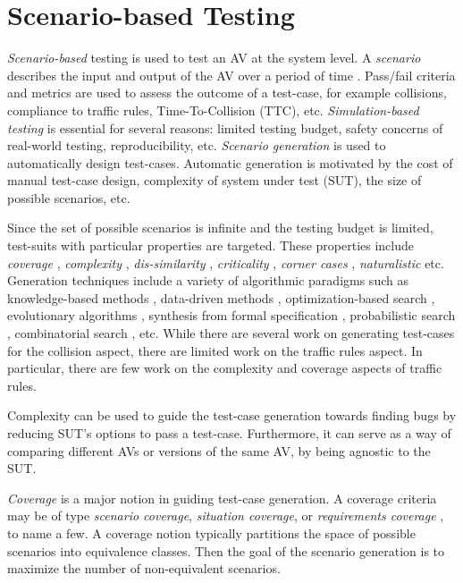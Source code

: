 \section{Scenario-based Testing}

\emph{Scenario-based} testing \cite{Riedmaier.2020} is used to test an AV at the system level.
%
A \emph{scenario} describes the input and output of the AV over a period of time \cite{Ulbrich.2015}.
%
Pass/fail criteria and metrics are used to assess the outcome of a test-case, for example collisions,  compliance to traffic rules, Time-To-Collision (TTC), etc.
%
\emph{Simulation-based testing} \cite{Abdessalem.2018:feature,Abdessalem.2018:vision,Abeysirigoonawardena.2019,Abdessalem.2016,Ding.2020,Gambi.2019,Norden.2019} is essential for several reasons: limited testing budget, safety concerns of real-world testing, reproducibility, etc.
%
\emph{Scenario generation} is used to automatically design test-cases.
%
Automatic generation is motivated by the cost of manual test-case design, complexity of system under test (SUT), the size of possible scenarios, etc.


Since the set of possible scenarios is infinite and the testing budget is limited, test-suits with particular properties are targeted.
%
These properties include \emph{coverage} \cite{Sheikhi.2022}, \emph{complexity} \cite{Gao.2019,Xia.2017,Xia.2018,Wang.2018},
 \emph{dis-similarity} \cite{Harder.2021}, \emph{criticality} \cite{Klischat.2019,Zhong.2021}, \emph{corner cases} \cite{OKelly.2018}, \emph{naturalistic} \cite{Akagi.2019}
 etc.
%
Generation techniques include a variety of algorithmic paradigms such as  knowledge-based methods \cite{Li.2020}, data-driven methods \cite{OKelly.2018}, optimization-based search \cite{Klischat.2020,Feng_Methodology.2020,Feng_CaseStudies.2020}, evolutionary algorithms \cite{Klischat.2019,Calo.2020,Zhong.2021,Sheikhi.2022}, synthesis from formal specification \cite{Klischat.2020,Tuncali.2019}, probabilistic search \cite{Fremont_testing.2020,Tuncali.2016}, combinatorial search \cite{Tuncali.2019,Gao.2019,Xia.2018}, etc.
%
While there are several work on generating test-cases for the collision aspect, there are limited work on the traffic rules aspect.
%
In particular, there are few work on the complexity and coverage aspects of traffic rules.


Complexity can be used to guide the test-case generation towards finding bugs by reducing SUT's options to pass a test-case.
%
Furthermore, it can serve as a way of comparing different AVs or versions of the same AV, by being agnostic to the SUT.


\emph{Coverage} \cite{Tahir.2020,Tahir.2022,Xia.2018,Hawkins.2019,Majzik.2019,Tang.2021} is a major notion in guiding test-case generation.
%
A coverage criteria may be of type \emph{scenario coverage}, \emph{situation coverage}, or \emph{requirements coverage} \cite{Tahir.2020}, to name a few.
%
A coverage notion typically partitions the space of possible scenarios into equivalence classes.
%
Then the goal of the scenario generation is to maximize the number of non-equivalent scenarios.
